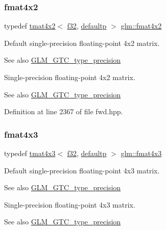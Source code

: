 \subsubsection{\texorpdfstring{fmat4x2}{fmat4x2}}
{\footnotesize\ttfamily typedef \mbox{\hyperlink{structglm_1_1tmat4x2}{tmat4x2}}$<$ \mbox{\hyperlink{group__gtc__type__precision_ga0ec999b57f5330d9021256e96038df04}{f32}}, \mbox{\hyperlink{namespaceglm_a0f04f086094c747d227af4425893f545a9d21ccd8b5a009ec7eb7677befc3bf51}{defaultp}} $>$ \mbox{\hyperlink{group__gtc__type__precision_ga9325d382b334066a4c90a814c9040359}{glm\+::fmat4x2}}}

Default single-\/precision floating-\/point 4x2 matrix. \begin{DoxySeeAlso}{See also}
\mbox{\hyperlink{group__gtc__type__precision}{G\+L\+M\+\_\+\+G\+T\+C\+\_\+type\+\_\+precision}}
\end{DoxySeeAlso}
Single-\/precision floating-\/point 4x2 matrix. \begin{DoxySeeAlso}{See also}
\mbox{\hyperlink{group__gtc__type__precision}{G\+L\+M\+\_\+\+G\+T\+C\+\_\+type\+\_\+precision}} 
\end{DoxySeeAlso}


Definition at line 2367 of file fwd.\+hpp.

\mbox{\label{group__gtc__type__precision_ga89195b7b13a41b0f1d34a962d1f66bfb}} 
\subsubsection{\texorpdfstring{fmat4x3}{fmat4x3}}
{\footnotesize\ttfamily typedef \mbox{\hyperlink{structglm_1_1tmat4x3}{tmat4x3}}$<$ \mbox{\hyperlink{group__gtc__type__precision_ga0ec999b57f5330d9021256e96038df04}{f32}}, \mbox{\hyperlink{namespaceglm_a0f04f086094c747d227af4425893f545a9d21ccd8b5a009ec7eb7677befc3bf51}{defaultp}} $>$ \mbox{\hyperlink{group__gtc__type__precision_ga89195b7b13a41b0f1d34a962d1f66bfb}{glm\+::fmat4x3}}}

Default single-\/precision floating-\/point 4x3 matrix. \begin{DoxySeeAlso}{See also}
\mbox{\hyperlink{group__gtc__type__precision}{G\+L\+M\+\_\+\+G\+T\+C\+\_\+type\+\_\+precision}}
\end{DoxySeeAlso}
Single-\/precision floating-\/point 4x3 matrix. \begin{DoxySeeAlso}{See also}
\mbox{\hyperlink{group__gtc__type__precision}{G\+L\+M\+\_\+\+G\+T\+C\+\_\+type\+\_\+precision}} 
\end{DoxySeeAlso}


